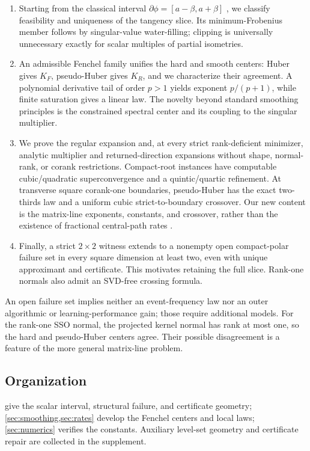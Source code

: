 \begin{enumerate}
 \item Starting from the classical interval
 \(\partial\phi=[a-\beta,a+\beta]\)
 \citep{watson1992subdifferential,lewis1995convex}, we classify feasibility
 and uniqueness of the tangency slice.  Its minimum-Frobenius member follows
 by singular-value water-filling; clipping is universally unnecessary exactly
 for scalar multiples of partial isometries.

 \item An admissible Fenchel family unifies the hard and smooth centers:
 Huber gives \(K_F\), pseudo-Huber gives \(K_R\), and we characterize their
 agreement.  A polynomial derivative tail of order \(p>1\) yields exponent
 \(p/(p+1)\), while finite saturation gives a linear law.  The novelty beyond
 standard smoothing principles
 \citep{nesterov2005smooth,liu2009nuclear,lobos2025smooth,attouch1984variational} is the
 constrained spectral center and its coupling to the singular multiplier.

 \item We prove the regular expansion and, at every strict rank-deficient
 minimizer, analytic multiplier and returned-direction expansions without
 shape, normal-rank, or corank restrictions.  Compact-root instances have
 computable cubic/quadratic superconvergence and a quintic/quartic refinement.
 At transverse square corank-one boundaries, pseudo-Huber has the exact
 two-thirds law and a uniform cubic strict-to-boundary crossover.  Our new
 content is the matrix-line exponents, constants, and crossover, rather than
 the existence of fractional central-path rates \citep{basu2022central}.

 \item Finally, a strict \(2\times2\) witness extends to a nonempty open
 compact-polar failure set in every square dimension at least two, even with
 unique approximant and certificate.  This motivates retaining the full
 slice.  Rank-one normals also admit an SVD-free crossing formula.
\end{enumerate}

An open failure set implies neither an event-frequency law nor an outer
algorithmic or learning-performance gain; those require additional models.
For the rank-one SSO normal, the projected kernel normal has rank at most one,
so the hard and pseudo-Huber centers agree.  Their possible disagreement is
a feature of the more general matrix-line problem.

\subsection{Organization}

 give the scalar interval, structural failure,
and certificate geometry; \cref{sec:smoothing,sec:rates} develop the Fenchel
centers and local laws; \cref{sec:numerics} verifies the constants.  Auxiliary
level-set geometry and certificate repair are collected in the supplement.
